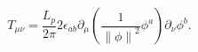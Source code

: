\begin{equation}
T_{\mu \nu }=\frac{L_p}{2\pi }2\epsilon _{ab}\partial _\mu (\frac 1{\left\|
\phi \right\| ^2}\phi ^a)\partial _\nu \phi ^b.
\end{equation}

